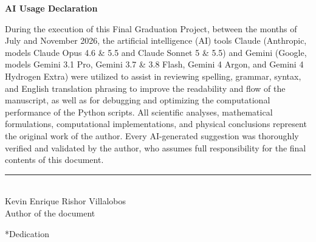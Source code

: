 \documentclass[12pt]{article}
\makeatletter
\providecommand{\chapter}{\@ifstar{\@schapter}{\@chapter}}
\def\@schapter#1{\section*{#1}}
\def\@chapter#1{\section{#1}}
\makeatother
\begin{document}
\clearpage
{}
{}
\thispagestyle{plain}

\vspace*{\fill}

\begin{center}
    {\Large\bfseries AI Usage Declaration}
\end{center}
\vspace{1.5em}

\noindent
During the execution of this Final Graduation Project, between the months of July and November 2026, the artificial intelligence (AI) tools Claude (Anthropic, models Claude Opus 4.6 \& 5.5 and Claude Sonnet 5 \& 5.5) and Gemini (Google, models Gemini 3.1 Pro, Gemini 3.7 \& 3.8 Flash, Gemini 4 Argon, and Gemini 4 Hydrogen Extra) were utilized to assist in reviewing spelling, grammar, syntax, and English translation phrasing to improve the readability and flow of the manuscript, as well as for debugging and optimizing the computational performance of the Python scripts. All scientific analyses, mathematical formulations, computational implementations, and physical conclusions represent the original work of the author. Every AI-generated suggestion was thoroughly verified and validated by the author, who assumes full responsibility for the final contents of this document.

\vspace{2.5cm}

\begin{center}
    \rule{7.5cm}{0.4pt}\\[0.3cm]
    Kevin Enrique Rishor Villalobos\\[0.2cm]
    Author of the document
\end{center}

\vspace*{\fill}

\clearpage
{}
{}
\chapter*{Dedication}
\thispagestyle{plain}
\end{document}
